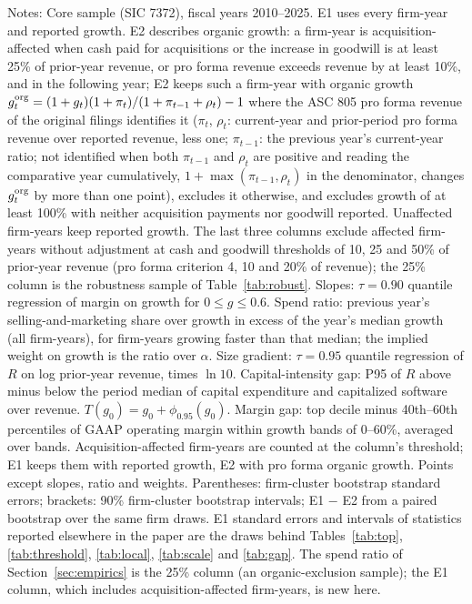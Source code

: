 \begin{table}[t]
\par\vspace{2pt}\footnotesize\raggedright Notes: Core sample (SIC 7372), fiscal years 2010--2025. E1 uses every firm-year and reported growth. E2 describes organic growth: a firm-year is acquisition-affected when cash paid for acquisitions or the increase in goodwill is at least 25\% of prior-year revenue, or pro forma revenue exceeds revenue by at least 10\%, and in the following year; E2 keeps such a firm-year with organic growth $g^{\rm org}_t=(1+g_t)(1+\pi_t)/(1+\pi_{t-1}+\rho_t)-1$ where the ASC 805 pro forma revenue of the original filings identifies it ($\pi_t$, $\rho_t$: current-year and prior-period pro forma revenue over reported revenue, less one; $\pi_{t-1}$: the previous year's current-year ratio; not identified when both $\pi_{t-1}$ and $\rho_t$ are positive and reading the comparative year cumulatively, $1+\max(\pi_{t-1},\rho_t)$ in the denominator, changes $g^{\rm org}_t$ by more than one point), excludes it otherwise, and excludes growth of at least 100\% with neither acquisition payments nor goodwill reported. Unaffected firm-years keep reported growth. The last three columns exclude affected firm-years without adjustment at cash and goodwill thresholds of 10, 25 and 50\% of prior-year revenue (pro forma criterion 4, 10 and 20\% of revenue); the 25\% column is the robustness sample of Table~\ref{tab:robust}. Slopes: $\tau=0.90$ quantile regression of margin on growth for $0\leq g\leq0.6$. Spend ratio: previous year's selling-and-marketing share over growth in excess of the year's median growth (all firm-years), for firm-years growing faster than that median; the implied weight on growth is the ratio over $\alpha$. Size gradient: $\tau=0.95$ quantile regression of $R$ on log prior-year revenue, times $\ln 10$. Capital-intensity gap: P95 of $R$ above minus below the period median of capital expenditure and capitalized software over revenue. $T(g_0)=g_0+\phi_{0.95}(g_0)$. Margin gap: top decile minus 40th--60th percentiles of GAAP operating margin within growth bands of 0--60\%, averaged over bands. Acquisition-affected firm-years are counted at the column's threshold; E1 keeps them with reported growth, E2 with pro forma organic growth. Points except slopes, ratio and weights. Parentheses: firm-cluster bootstrap standard errors; brackets: 90\% firm-cluster bootstrap intervals; E1 $-$ E2 from a paired bootstrap over the same firm draws. E1 standard errors and intervals of statistics reported elsewhere in the paper are the draws behind Tables~\ref{tab:top}, \ref{tab:threshold}, \ref{tab:local}, \ref{tab:scale} and \ref{tab:gap}. The spend ratio of Section~\ref{sec:empirics} is the 25\% column (an organic-exclusion sample); the E1 column, which includes acquisition-affected firm-years, is new here.
\end{table}